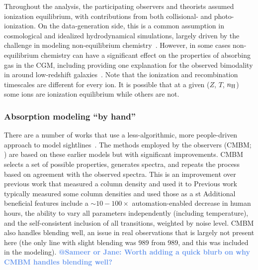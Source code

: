\documentclass[fleqn,usenatbib]{mnras}
\makeatletter
\newcommand{\atsameer}[1]{\textcolor{CornflowerBlue}{\textbf{@Sameer or Jane: #1}}}
\makeatother
\begin{document}
Throughout the analysis, the participating observers and theorists assumed ionization equilibrium, with contributions from both collisional- and photo-ionization.
On the data-generation side, this is a common assumption in cosmological and idealized hydrodynamical simulations, largely driven by the challenge in modeling non-equilibrium chemistry~\citep[e.g.][]{richings2014Nonequilibrium}.
However, in some cases non-equilibrium chemistry can have a significant effect on the properties of absorbing gas in the CGM, including providing one explanation for the observed bimodality in  around low-redshift galaxies~\citep{oppenheimer2016Bimodality}.
Note that the ionization and recombination timescales are different for every ion.
It is possible that at a given ($Z$, $T$, $n_{\rm H}$) some ions are ionization equilibrium while others are not.

\subsubsection{Absorption modeling ``by hand''}

There are a number of works that use a less-algorithmic, more people-driven approach to model sightlines~\citep[e.g.][]{churchill1999multiple, charlton2000anticipating, ding2003quadruple, charlton2003high, ding2003multiphase, zonak2004absorption, ding2005absorption, masiero2005models, lynch2007physical, misawa2008supersolar, lacki2010z, jones2010bare, muzahid2015extreme, richter2018, rosenwasser2018understanding, norris2021Discovery}.
The methods employed by the observers (CMBM; \citealt{Sameer2021, Sameer2022}) are based on these earlier models but with significant improvements.
CMBM selects a set of possible properties, generates spectra, and repeats the process based on agreement with the observed spectra.
This is an improvement over previous work that measured a column density and used it to
Previous work typically measured some column densities and used those as a st
Additional beneficial features include
a $\sim 10-100 \times$ automation-enabled decrease in human hours,
the ability to vary all parameters independently (including temperature),
and the self-consistent inclusion of all transitions, weighted by noise level.
CMBM also handles blending well, an issue in real observations that is largely not present here
(the only line with slight blending was  989 from  989, and this was included in the modeling).
\atsameer{Worth adding a quick blurb on why CMBM handles blending well?}
\end{document}

